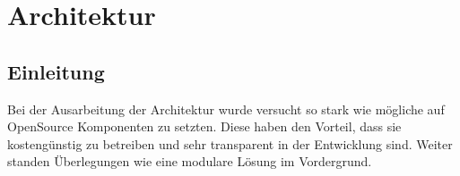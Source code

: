 \section{Architektur}
\subsection{Einleitung}
Bei der Ausarbeitung der Architektur wurde versucht so stark wie mögliche auf OpenSource Komponenten zu setzten. Diese haben den Vorteil, dass sie kostengünstig zu betreiben und sehr transparent in der Entwicklung sind. Weiter standen Überlegungen wie eine modulare Lösung im Vordergrund.

